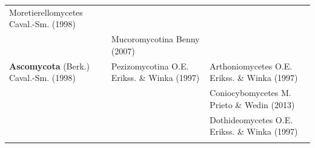 \documentclass[]{book}
\begin{document}
\begin{longtable}[]{@{}lll@{}}
\begin{minipage}[t]{0.31\columnwidth}
Moretierellomycetes Caval.-Sm. (1998)\strut
\end{minipage}\tabularnewline
\begin{minipage}[t]{0.32\columnwidth}\raggedright
\strut
\end{minipage} & \begin{minipage}[t]{0.28\columnwidth}\raggedright
Mucoromycotina Benny (2007)\strut
\end{minipage} & \begin{minipage}[t]{0.31\columnwidth}\raggedright
\strut
\end{minipage}\tabularnewline
\begin{minipage}[t]{0.32\columnwidth}\raggedright
\textbf{Ascomycota} (Berk.) Caval.-Sm. (1998)\strut
\end{minipage} & \begin{minipage}[t]{0.28\columnwidth}\raggedright
Pezizomycotina O.E. Erikss. \& Winka (1997)\strut
\end{minipage} & \begin{minipage}[t]{0.31\columnwidth}\raggedright
Arthoniomycetes O.E. Erikss. \& Winka (1997)\strut
\end{minipage}\tabularnewline
\begin{minipage}[t]{0.32\columnwidth}\raggedright
\strut
\end{minipage} & \begin{minipage}[t]{0.28\columnwidth}\raggedright
\strut
\end{minipage} & \begin{minipage}[t]{0.31\columnwidth}\raggedright
Coniocybomycetes M. Prieto \& Wedin (2013)\strut
\end{minipage}\tabularnewline
\begin{minipage}[t]{0.32\columnwidth}\raggedright
\strut
\end{minipage} & \begin{minipage}[t]{0.28\columnwidth}\raggedright
\strut
\end{minipage} & \begin{minipage}[t]{0.31\columnwidth}\raggedright
Dothideomycetes O.E. Erikss. \& Winka (1997)\strut
\end{minipage}\tabularnewline
\begin{minipage}[t]{0.32\columnwidth}\raggedright
\strut
\end{minipage} & \begin{minipage}[t]{0.28\columnwidth}\raggedright
\strut
\end{minipage} & \begin{minipage}[t]{0.31\columnwidth}\raggedright

\end{minipage}
\end{longtable}
\end{document}
